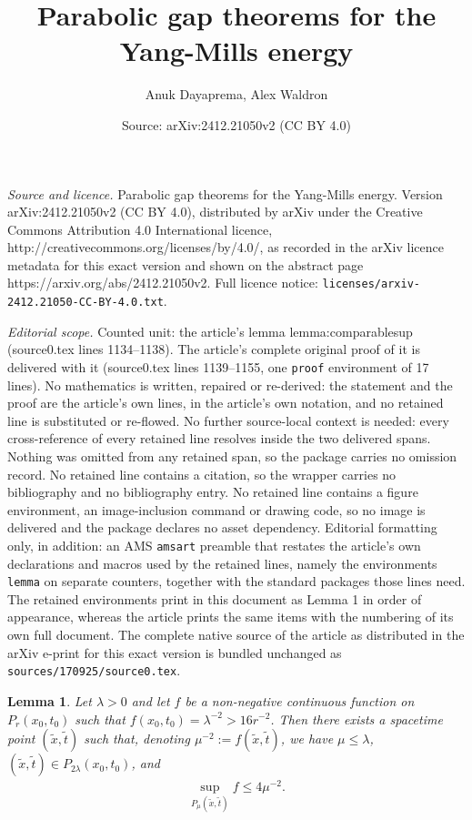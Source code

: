 \documentclass[10pt,a4paper]{amsart}
\title{Parabolic gap theorems for the Yang-Mills energy}
\author{Anuk Dayaprema, Alex Waldron}
\date{Source: arXiv:2412.21050v2 (CC BY 4.0)}
\newtheorem{lemma}{Lemma}
\begin{document}
\maketitle

\noindent\emph{Source and licence.} Parabolic gap theorems for the Yang-Mills energy. Version arXiv:2412.21050v2 (CC BY 4.0), distributed by arXiv under the Creative Commons Attribution 4.0 International licence, http://creativecommons.org/licenses/by/4.0/, as recorded in the arXiv licence metadata for this exact version and shown on the abstract page https://arxiv.org/abs/2412.21050v2. Full licence notice: \texttt{licenses/arxiv-2412.21050-CC-BY-4.0.txt}.\par\smallskip

\noindent\textit{Editorial scope.} Counted unit: the article's lemma lemma:comparablesup (source0.tex lines 1134--1138). The article's complete original proof of it is delivered with it (source0.tex lines 1139--1155, one \texttt{proof} environment of 17 lines). No mathematics is written, repaired or re-derived: the statement and the proof are the article's own lines, in the article's own notation, and no retained line is substituted or re-flowed.  No further source-local context is needed: every cross-reference of every retained line resolves inside the two delivered spans.  Nothing was omitted from any retained span, so the package carries no omission record.  No retained line contains a citation, so the wrapper carries no bibliography and no bibliography entry.  No retained line contains a figure environment, an image-inclusion command or drawing code, so no image is delivered and the package declares no asset dependency.  Editorial formatting only, in addition: an AMS \texttt{amsart} preamble that restates the article's own declarations and macros used by the retained lines, namely the environments \texttt{lemma} on separate counters, together with the standard packages those lines need.  The retained environments print in this document as Lemma 1 in order of appearance, whereas the article prints the same items with the numbering of its own full document.  The complete native source of the article as distributed in the arXiv e-print for this exact version is bundled unchanged as \texttt{sources/170925/source0.tex}.
\begin{lemma}\label{lemma:comparablesup}
    Let \(\lambda > 0\) and let \(f\) be a non-negative continuous function on \(P_r(x_0, t_0)\) such that \(f(x_0, t_0) = \lambda^{-2} > 16r^{-2}\). Then there exists a spacetime point \((\tilde{x}, \tilde{t})\) such that, denoting \(\mu^{-2} := f(\tilde{x}, \tilde{t})\), we have \(\mu \leq \lambda\), \((\tilde{x}, \tilde{t}) \in P_{2\lambda}(x_0, t_0)\), and     \begin{align} \label{comparablesupbound}
\sup_{P_\mu(\tilde{x}, \tilde{t})} f \leq 4\mu^{-2}.
    \end{align}
\end{lemma}
\end{document}
